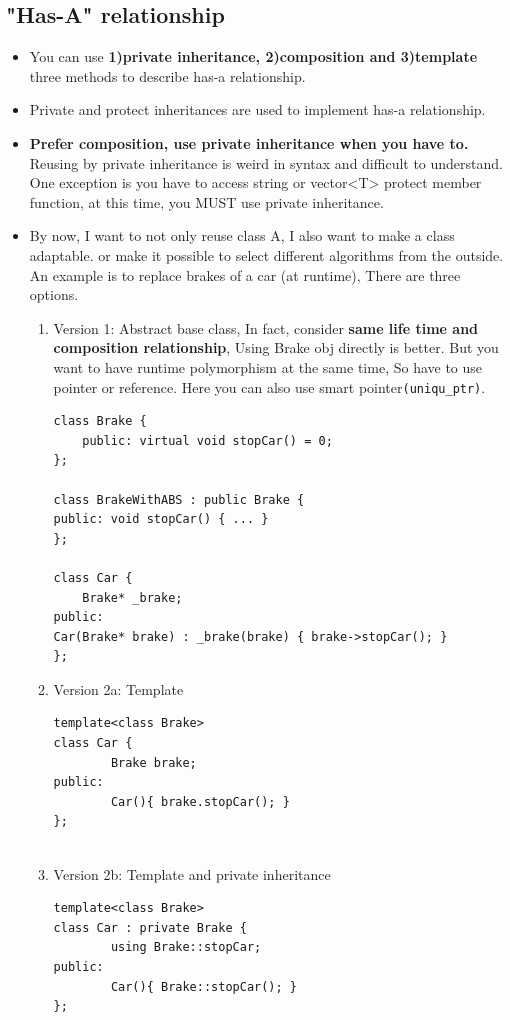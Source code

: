 \documentclass[a4paper,11pt,twoside]{book}
\begin{document}
\subsection{"Has-A" relationship}
\begin{itemize}
	\item You can use \textbf{1)private inheritance, 2)composition and 3)template} three methods to describe has-a relationship.
	
	\item Private and protect inheritances are used to implement has-a relationship. 

	\item \textbf{Prefer composition, use private inheritance when you have to.} Reusing by private inheritance is weird in syntax and difficult to understand. One exception is you have to access string or vector<T> protect member function, at this time, you MUST use private inheritance.
	
	\item By now, I want to not only reuse class A, I also want to make a class adaptable. or make it possible to select different algorithms from the outside.  An example is  to replace brakes of a car (at runtime), There are three options.
	\begin{enumerate}
		\item Version 1: Abstract base class, In fact, consider \textbf{same life time and composition relationship},  Using Brake obj directly is better. But you want to have runtime polymorphism at the same time, So have to use pointer or reference. Here you can also use smart pointer\texttt{(uniqu\_ptr)}.
\begin{lstlisting}[numbers=none]
class Brake {
	public: virtual void stopCar() = 0;
};
		
class BrakeWithABS : public Brake {
public: void stopCar() { ... }
};
		
class Car {
	Brake* _brake;
public:
Car(Brake* brake) : _brake(brake) { brake->stopCar(); }
};
\end{lstlisting}
		
		\item Version 2a: Template
		
\begin{lstlisting}[numbers=none]
template<class Brake>
class Car {
		Brake brake;
public:
		Car(){ brake.stopCar(); }
};
		
\end{lstlisting}
		\item Version 2b: Template and private inheritance
\begin{lstlisting}[numbers=none]
template<class Brake>
class Car : private Brake {
		using Brake::stopCar;
public:
		Car(){ Brake::stopCar(); }
};
\end{lstlisting}
	\end{enumerate}
	

\end{itemize}
\end{document}
